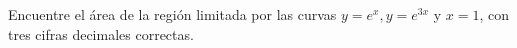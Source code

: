 \item Encuentre el área de la región limitada por las curvas $y = e^x, y = e^{3x}$ y $x = 1$, con tres cifras decimales correctas.
